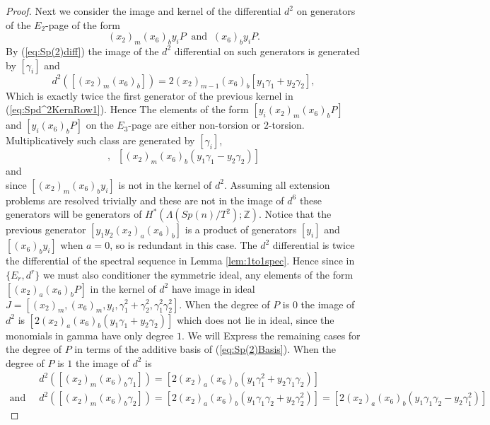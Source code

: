 \documentclass{article}
\theoremstyle{plain}
\theoremstyle{definition}
\numberwithin{thm}{section}
\begin{document}
\begin{proof}
			Next we consider the image and kernel of the differential $d^2$ on generators of the $E_2$-page of the form
			\begin{equation*}
				(x_2)_m(x_6)_by_iP \;\; \text{and} \;\; (x_6)_by_iP.
			\end{equation*}
			By (\ref{eq:Sp(2)diff})	the image of the $d^2$ differential on such generators is generated by $[\gamma_i]$ and
			\begin{equation*}
				d^2([(x_2)_m(x_6)_b])=2(x_2)_{m-1}(x_6)_b[y_1\gamma_1+y_2\gamma_2],
			\end{equation*}
			Which is exactly twice the first generator of the previous kernel in (\ref{eq:Spd^2KernRow1}).
			Hence The elements of the form $[y_i(x_2)_m(x_6)_bP]$ and $[y_i(x_6)_bP]$ on the $E_3$-page
			are either non-torsion or $2$-torsion.
			Multiplicatively such class are generated by $[\gamma_i]$,
			\begin{equation*}
				[(x_2)_m(x_6)_b(y_1\gamma_2+y_2\gamma_1)], \;\; [(x_2)_m(x_6)_b(y_1\gamma_1-y_2\gamma_2)]
			\end{equation*}
			and 
			\begin{equation*}
				[(x_6)_by_i]
			\end{equation*}			
			since $[(x_2)_m(x_6)_by_i]$ is not in the kernel of $d^2$.
			Assuming all extension problems are resolved trivially and these are not in the image of $d^6$ these generators will be generators of
			$H^*(\Lambda(Sp(n)/T^2);\mathbb{Z})$.
			Notice that the previous generator $[y_1y_2(x_2)_a(x_6)_b]$ is a product of generators $[y_i]$ and $[(x_6)_by_i]$
			when $a=0$, so is redundant in this case.
			The $d^2$ differential is twice the differential of the spectral sequence in Lemma \ref{lem:1to1spec}.
			Hence since in $\{ E_r,d^r \}$ we must also conditioner the symmetric ideal, any elements of the form $[(x_2)_a(x_6)_bP]$ in the kernel of $d^2$
			have image in ideal $J=[(x_2)_m,(x_6)_m,y_i,\gamma_1^2+\gamma_2^2,\gamma_1^2\gamma_2^2]$.
			When the degree of $P$ is $0$ the image of $d^2$ is $[2(x_2)_a(x_6)_b(y_1\gamma_1+y_2\gamma_2)]$
			which does not lie in ideal, since the monomials in gamma have only degree $1$.
			We will Express the remaining cases for the degree of $P$ in terms of the additive basis of (\ref{eq:Sp(2)Basis}).
			When the degree of $P$ is $1$ the image of $d^2$ is
			\begin{align*}
												&d^2([(x_2)_m(x_6)_b\gamma_1])=[2(x_2)_a(x_6)_b(y_1\gamma_1^2+y_2\gamma_1\gamma_2)] \\
				\text{and} \;\; &d^2([(x_2)_m(x_6)_b\gamma_2])=[2(x_2)_a(x_6)_b(y_1\gamma_1\gamma_2+y_2\gamma_2^2)]=[2(x_2)_a(x_6)_b(y_1\gamma_1\gamma_2-y_2\gamma_1^2)]

\end{align*}
\end{proof}
\end{document}
